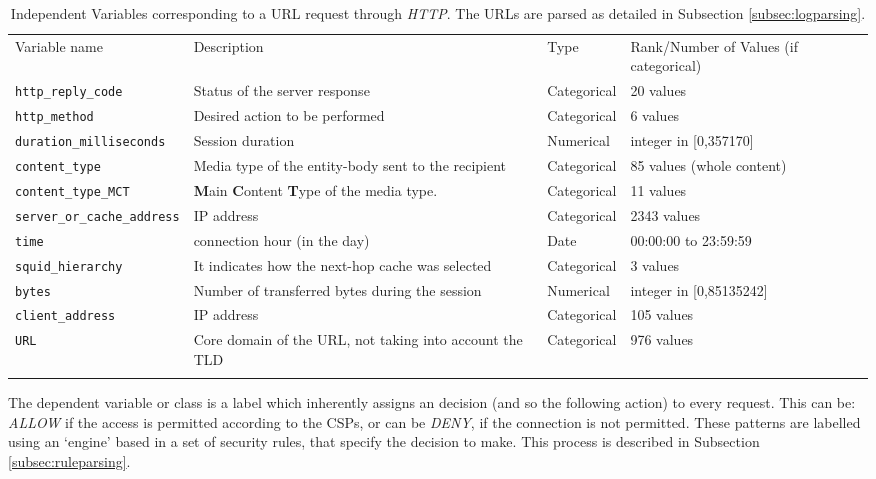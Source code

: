 \documentclass{llncs}
\begin{document}
\begin{table*}[htpb]
\centering
 \caption{\label{tabdata} Independent Variables corresponding to a URL request through \textit{HTTP}. The URLs are parsed as detailed in Subsection \ref{subsec:logparsing}.}
{\scriptsize
\begin{tabular}{llll}
\hline\noalign{\smallskip}
Variable name & Description & Type & Rank/Number of Values (if categorical)\\
\noalign{\smallskip}\hline\noalign{\smallskip}
\texttt{http\_reply\_code} & Status of the server response & Categorical & 20 values\\
\texttt{http\_method} & Desired action to be performed & Categorical & 6 values\\
\texttt{duration\_milliseconds} & Session duration & Numerical & integer in [0,357170]\\
\texttt{content\_type} & Media type of the entity-body sent to the recipient & Categorical & 85 values (whole content)\\
\texttt{content\_type\_MCT} & \textbf{M}ain \textbf{C}ontent \textbf{T}ype of the media type. & Categorical & 11 values\\
\texttt{server\_or\_cache\_address} & IP address & Categorical & 2343 values\\
\texttt{time} & connection hour (in the day) & Date & 00:00:00 to 23:59:59\\
\texttt{squid\_hierarchy} & It indicates how the next-hop cache was selected & Categorical & 3 values\\
\texttt{bytes} & Number of transferred bytes during the session & Numerical & integer in [0,85135242]\\
\texttt{client\_address} & IP address & Categorical & 105 values\\
\texttt{URL} & Core domain of the URL, not taking into account the TLD & Categorical & 976 values\\
\noalign{\smallskip}\hline
\end{tabular}
}
\end{table*}

The dependent variable or class is a label which inherently assigns an decision (and so the following action) to every request. This can be: \textit{ALLOW} if the access is permitted according to the CSPs, or can be \textit{DENY}, if the connection is not permitted. These patterns are labelled using an `engine' based in a set of security rules, that specify the decision to make. This process is described in Subsection \ref{subsec:ruleparsing}.
\end{document}
